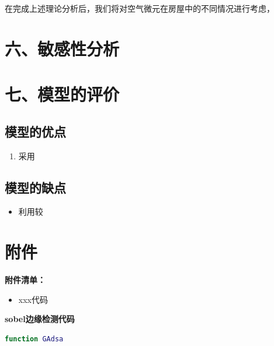\documentclass{my_paper}
\begin{document}
在完成上述理论分析后，我们将对空气微元在房屋中的不同情况进行考虑，
\section{六、敏感性分析}
\section{七、模型的评价}

\subsection{模型的优点}
\begin{enumerate}
    \item 采用

\end{enumerate}

\subsection{模型的缺点}
\begin{itemize}
    \item 利用较

\end{itemize}

\newpage
\begin{center}
\end{center}

\newpage
\section{附件}
\textbf{附件清单：}
\renewcommand\theenumi{\roman{enumi}}
\renewcommand\labelenumi{\textbf{附录\theenumi}}
\begin{itemize}
    \item xxx代码
\end{itemize}

\textbf{sobel边缘检测代码}

\begin{lstlisting}[language=matlab]
    function GAdsa 
\end{lstlisting}
\end{document}
